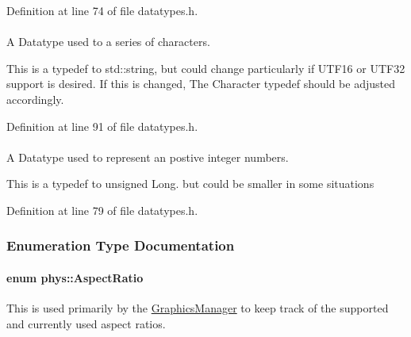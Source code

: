 Definition at line 74 of file datatypes.h.

\hypertarget{namespacephys_aa03900411993de7fbfec4789bc1d392e}{
\paragraph[{String}]{}\hfill}
\label{namespacephys_aa03900411993de7fbfec4789bc1d392e}


A Datatype used to a series of characters. 

This is a typedef to std::string, but could change particularly if UTF16 or UTF32 support is desired. If this is changed, The Character typedef should be adjusted accordingly. 

Definition at line 91 of file datatypes.h.

\hypertarget{namespacephys_a460f6bc24c8dd347b05e0366ae34f34a}{
\paragraph[{Whole}]{}\hfill}
\label{namespacephys_a460f6bc24c8dd347b05e0366ae34f34a}


A Datatype used to represent an postive integer numbers. 

This is a typedef to unsigned Long. but could be smaller in some situations 

Definition at line 79 of file datatypes.h.



\subsubsection{Enumeration Type Documentation}
\hypertarget{namespacephys_aa48055a9624c26d73f77ca67499c7aed}{
\paragraph[{AspectRatio}]{\setlength{\rightskip}{0pt plus 5cm}enum {\bf phys::AspectRatio}}\hfill}
\label{namespacephys_aa48055a9624c26d73f77ca67499c7aed}


This is used primarily by the \hyperlink{classphys_1_1GraphicsManager}{GraphicsManager} to keep track of the supported and currently used aspect ratios. 

